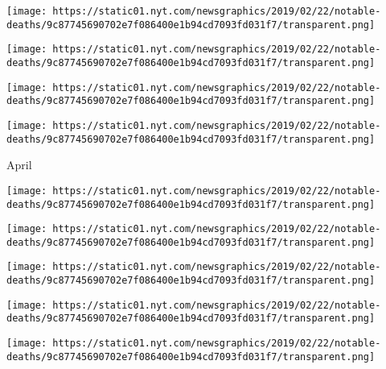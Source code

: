 \texttt{[image: https://static01.nyt.com/newsgraphics/2019/02/22/notable-deaths/9c87745690702e7f086400e1b94cd7093fd031f7/transparent.png]}

\href{https://www.nytimes.com/2019/05/02/obituaries/red-kelly-dead.html}{}

\texttt{[image: https://static01.nyt.com/newsgraphics/2019/02/22/notable-deaths/9c87745690702e7f086400e1b94cd7093fd031f7/transparent.png]}

\href{https://www.nytimes.com/2019/05/02/obituaries/les-murray-dead.html}{}

\texttt{[image: https://static01.nyt.com/newsgraphics/2019/02/22/notable-deaths/9c87745690702e7f086400e1b94cd7093fd031f7/transparent.png]}

\href{https://www.nytimes.com/2019/05/01/obituaries/ellen-tauscher-dead.html}{}

\texttt{[image: https://static01.nyt.com/newsgraphics/2019/02/22/notable-deaths/9c87745690702e7f086400e1b94cd7093fd031f7/transparent.png]}

April

\href{https://www.nytimes.com/2019/04/30/obituaries/mavis-pusey-dead.html}{}

\texttt{[image: https://static01.nyt.com/newsgraphics/2019/02/22/notable-deaths/9c87745690702e7f086400e1b94cd7093fd031f7/transparent.png]}

\href{https://www.nytimes.com/2019/04/30/obituaries/gino-marchetti-dead.html}{}

\texttt{[image: https://static01.nyt.com/newsgraphics/2019/02/22/notable-deaths/9c87745690702e7f086400e1b94cd7093fd031f7/transparent.png]}

\href{https://www.nytimes.com/2019/04/30/obituaries/martin-kilson-dead.html}{}

\texttt{[image: https://static01.nyt.com/newsgraphics/2019/02/22/notable-deaths/9c87745690702e7f086400e1b94cd7093fd031f7/transparent.png]}

\href{https://www.nytimes.com/2019/04/29/obituaries/john-singleton-dead.html}{}

\texttt{[image: https://static01.nyt.com/newsgraphics/2019/02/22/notable-deaths/9c87745690702e7f086400e1b94cd7093fd031f7/transparent.png]}

\href{https://www.nytimes.com/2019/04/29/obituaries/monir-farmanfarmaian-dead.html}{}

\texttt{[image: https://static01.nyt.com/newsgraphics/2019/02/22/notable-deaths/9c87745690702e7f086400e1b94cd7093fd031f7/transparent.png]}

